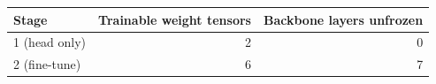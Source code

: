 \begin{tabular}{lrr}
\toprule
\textbf{Stage} & \textbf{Trainable weight tensors} & \textbf{Backbone layers unfrozen} \\
\midrule
1 (head only) & 2 & 0 \\
2 (fine-tune) & 6 & 7 \\
\bottomrule
\end{tabular}
